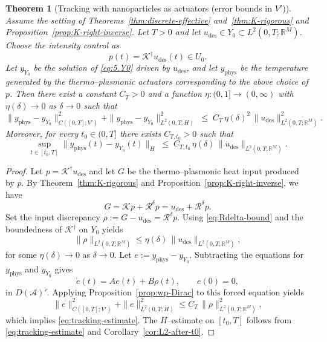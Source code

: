 \documentclass[11pt,a4paper]{article}
\numberwithin{equation}{section}
\newtheorem{theorem}{Theorem}[section]
\theoremstyle{definition}
\newcommand{\R}{\mathbb{R}}
\newcommand{\1}{\mathbbm{1}}
\begin{document}
\begin{theorem}[Tracking with nanoparticles as actuators (error bounds in $V'$)]
\label{thm:5.7}
Assume the setting of Theorems~\ref{thm:discrete-effective} and~\ref{thm:K-rigorous} and
Proposition~\ref{prop:K-right-inverse}. Let $T>0$ and let $u_{\mathrm{des}}\in Y_0\subset L^2(0,T;\R^M)$.
Choose the intensity control as
\[
  p(t) = \mathcal{K}^\dagger u_{\mathrm{des}}(t)\in U_0.
\]
Let $y_{Y_0}$ be the solution of \eqref{eq:5.Y0}  driven by $u_{\mathrm{des}}$, and let $y_{\mathrm{phys}}$
be the temperature generated by the thermo--plasmonic actuators corresponding to the above choice of $p$.
Then there exist a constant $C_T>0$ and a function $\eta:(0,1]\to(0,\infty)$ with $\eta(\delta)\to 0$
as $\delta\to 0$ such that
\begin{equation}
\label{eq:tracking-estimate}
\| y_{\mathrm{phys}} - y_{Y_0} \|_{C([0,T];V')}^2 + \| y_{\mathrm{phys}} - y_{Y_0} \|_{L^2(0,T;H)}^2
\;\le\; C_T\,\eta(\delta)^2\,\|u_{\mathrm{des}}\|_{L^2(0,T;\R^M)}^2.
\end{equation}
Moreover, for every $t_0\in(0,T]$ there exists $C_{T,t_0}>0$ such that
\begin{equation}
\label{eq:tracking-estimate-H-after-t0}
\sup_{t\in[t_0,T]} \| y_{\mathrm{phys}}(t) - y_{Y_0}(t) \|_{H}
\;\le\; C_{T,t_0}\,\eta(\delta)\,\|u_{\mathrm{des}}\|_{L^2(0,T;\R^M)}.
\end{equation}
\end{theorem}

\begin{proof}
Let $p=\mathcal{K}^\dagger u_{\mathrm{des}}$ and let $G$ be the thermo--plasmonic heat input produced by $p$.
By Theorem~\ref{thm:K-rigorous} and Proposition~\ref{prop:K-right-inverse}, we have
\[
G = \mathcal{K}p + \mathcal{R}^\delta p
  = u_{\mathrm{des}} + \mathcal{R}^\delta p.
\]
Set the input discrepancy $\rho := G-u_{\mathrm{des}}=\mathcal{R}^\delta p$.
Using \eqref{eq:Rdelta-bound} and the boundedness of $\mathcal{K}^\dagger$ on $Y_0$ yields
\[
\|\rho\|_{L^2(0,T;\R^M)}
\le \eta(\delta)\,\|u_{\mathrm{des}}\|_{L^2(0,T;\R^M)},
\]
for some $\eta(\delta)\to 0$ as $\delta\to 0$.
\noindent
Let $e:=y_{\mathrm{phys}}-y_{Y_0}$. Subtracting the equations for $y_{\mathrm{phys}}$ and $y_{Y_0}$ gives
\[
\dot e(t)=A e(t) + B\rho(t),\qquad e(0)=0,
\]
in $D(\mathcal A)'$. Applying Proposition~\ref{prop:wp-Dirac} to this forced equation yields
\[
\|e\|_{C([0,T];V')}^2 + \|e\|_{L^2(0,T;H)}^2
\le C_T\,\|\rho\|_{L^2(0,T;\R^M)}^2,
\]
which implies \eqref{eq:tracking-estimate}. The $H$--estimate on $[t_0,T]$ follows from
\eqref{eq:tracking-estimate} and Corollary~\ref{cor:L2-after-t0}.
\end{proof}
\end{document}
